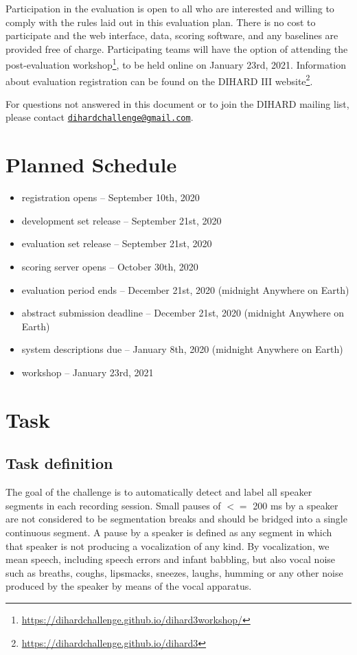 \documentclass{article}
\newcommand{\email}[1]{\href{mailto:#1}{\nolinkurl{#1}}}
\begin{document}
Participation in the evaluation is open to all who are interested and willing to comply with the rules laid out in this evaluation plan. There is no cost to participate and the web interface, data, scoring software, and any baselines are provided free of charge. Participating teams will have the option of attending the post-evaluation workshop\footnote{\url{https://dihardchallenge.github.io/dihard3workshop/}}, to be held online on January 23rd, 2021. Information about evaluation registration can be found on the DIHARD III website\footnote{\url{https://dihardchallenge.github.io/dihard3}}.

For questions not answered in this document or to join the DIHARD mailing list, please contact \email{dihardchallenge@gmail.com}. 
    
    
    
    
    
    
    
\section{Planned Schedule}
\label{sec:schedule}
	\begin{itemize}
        \item registration opens  -- September 10th, 2020
    	\item development set release  --  September 21st, 2020
    	\item evaluation set release  --  September 21st, 2020
    	\item scoring server opens  --  October 30th, 2020
    	\item evaluation period ends  --  December 21st, 2020 (midnight Anywhere on Earth)
    	\item abstract submission deadline  --  December 21st, 2020 (midnight Anywhere on Earth)
    	\item system descriptions due  --  January 8th, 2020 (midnight Anywhere on Earth)
    	\item workshop  --  January 23rd, 2021
    \end{itemize}

    

\section{Task}
\subsection{Task definition}
The goal of the challenge is to automatically detect and label all speaker segments in each recording session. Small pauses of $<=$ 200 ms by a speaker are not considered to be segmentation breaks and should be bridged into a single continuous segment. A pause by a speaker is defined as any segment in which that speaker is not producing a vocalization of any kind. By vocalization, we mean speech, including speech errors and infant babbling, but also vocal noise such as breaths, coughs, lipsmacks, sneezes, laughs, humming or any other noise produced by the speaker by means of the vocal apparatus.
\end{document}
